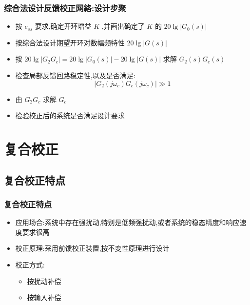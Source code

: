 \documentclass[table]{article}
\begin{document}
\begin{frame}
\frametitle{综合法设计反馈校正网絡:设计步聚}
\label{sec-3-3-3}

\begin{itemize}
\item 按  $e_{ss}$  要求,确定开环增益 $K$  ,并画出确定了 $K$  的 $20\lg|G_0(s)|$
\item 按综合法设计期望开环对数幅频特性 $20\lg|G(s)|$
\item <2->按  $20\lg|G_2 G_c|=20\lg|G_0(s)|-20\lg |G(s)|$  求解  $G_2(s)G_c(s)$
\item <3->检查局部反馈回路稳定性,以及是否满足:  
	    \[|G_2(j\omega_c)G_c(j\omega_c)|\gg 1\]
\item <4->由 $G_2G_c$ 求解 $G_c$
\item <5->检验校正后的系统是否满足设计要求
\end{itemize}
\end{frame}
\section{复合校正}
\label{sec-4}
\subsection{复合校正特点}
\label{sec-4-1}
\begin{frame}
\frametitle{复合校正特点}
\label{sec-4-1-1}

\begin{itemize}
\item 应用场合:系统中存在强扰动,特别是低频强扰动,或者系统的稳态精度和响应速度要求很高
\item <2->校正原理:采用前馈校正装置,按不变性原理进行设计
\item <3->校正方式:
\begin{itemize}
\item 按扰动补偿
\item 按输入补偿
\end{itemize}
\end{itemize}
\end{frame}
\end{document}

